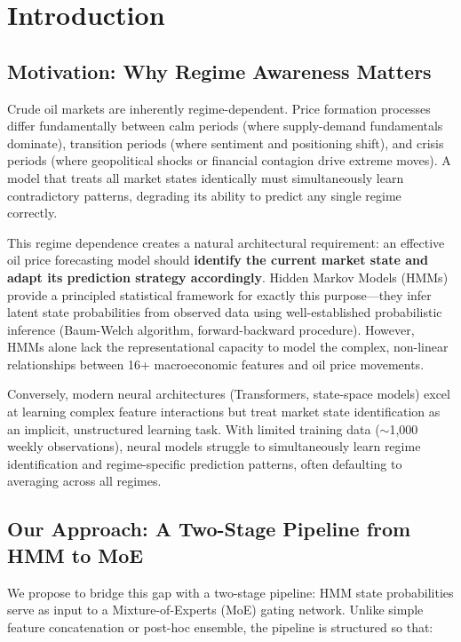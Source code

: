 \documentclass[3p,times]{elsarticle}
\begin{document}
\section{Introduction}
\label{sec:intro}

\subsection{Motivation: Why Regime Awareness Matters}
\label{sec:intro:motivation}

Crude oil markets are inherently regime-dependent. Price formation processes differ fundamentally between calm periods (where supply-demand fundamentals dominate), transition periods (where sentiment and positioning shift), and crisis periods (where geopolitical shocks or financial contagion drive extreme moves). A model that treats all market states identically must simultaneously learn contradictory patterns, degrading its ability to predict any single regime correctly.

This regime dependence creates a natural architectural requirement: an effective oil price forecasting model should \textbf{identify the current market state and adapt its prediction strategy accordingly}. Hidden Markov Models (HMMs) provide a principled statistical framework for exactly this purpose---they infer latent state probabilities from observed data using well-established probabilistic inference (Baum-Welch algorithm, forward-backward procedure). However, HMMs alone lack the representational capacity to model the complex, non-linear relationships between 16+ macroeconomic features and oil price movements.

Conversely, modern neural architectures (Transformers, state-space models) excel at learning complex feature interactions but treat market state identification as an implicit, unstructured learning task. With limited training data ($\sim$1,000 weekly observations), neural models struggle to simultaneously learn regime identification and regime-specific prediction patterns, often defaulting to averaging across all regimes.

\subsection{Our Approach: A Two-Stage Pipeline from HMM to MoE}
\label{sec:intro:approach}

We propose to bridge this gap with a two-stage pipeline: HMM state probabilities serve as input to a Mixture-of-Experts (MoE) gating network. Unlike simple feature concatenation or post-hoc ensemble, the pipeline is structured so that:
\end{document}

